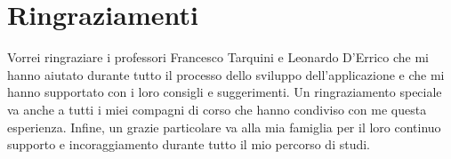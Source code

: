 \chapter*{Ringraziamenti}
Vorrei ringraziare i professori Francesco Tarquini e Leonardo D'Errico che mi hanno aiutato durante tutto il processo dello sviluppo dell'applicazione e che mi hanno supportato con i loro consigli e suggerimenti. Un ringraziamento speciale va anche a tutti i miei compagni di corso che hanno condiviso con me questa esperienza. Infine, un grazie particolare va alla mia famiglia per il loro continuo supporto e incoraggiamento durante tutto il mio percorso di studi.